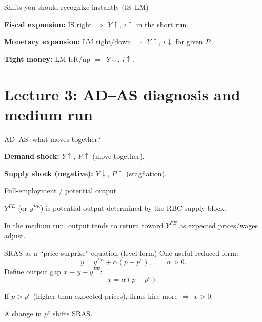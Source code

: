 \documentclass[aspectratio=169,xcolor=dvipsnames]{beamer}
\let\tempone\itemize
\let\temptwo\enditemize
\renewenvironment{itemize}{\tempone\addtolength{\itemsep}{\fill}}{\temptwo}
\begin{document}
\begin{frame}{Shifts you should recognize instantly (IS--LM)}
\begin{itemize}
\item \textbf{Fiscal expansion:} IS right $\Rightarrow$ $Y\uparrow$, $i\uparrow$ in the short run.
\item \textbf{Monetary expansion:} LM right/down $\Rightarrow$ $Y\uparrow$, $i\downarrow$ for given $P$.
\item \textbf{Tight money:} LM left/up $\Rightarrow$ $Y\downarrow$, $i\uparrow$.
\end{itemize}
\end{frame}

\section[Lecture 3]{Lecture 3: AD--AS diagnosis and medium run}

\begin{frame}{AD--AS: what moves together?}
\begin{itemize}
\item \textbf{Demand shock:} $Y\uparrow$, $P\uparrow$ (move together).
\item \textbf{Supply shock (negative):} $Y\downarrow$, $P\uparrow$ (stagflation).
\end{itemize}
\end{frame}

\begin{frame}{Full-employment / potential output}
\begin{itemize}
\item $Y^{FE}$ (or $y^{FE}$) is potential output determined by the RBC supply block.
\item In the medium run, output tends to return toward $Y^{FE}$ as expected prices/wages adjust.
\end{itemize}
\end{frame}

\begin{frame}{SRAS as a ``price surprise'' equation (level form)}
One useful reduced form:
\[
y=y^{FE}+\alpha(p-p^e),\qquad \alpha>0.
\]
Define output gap $x\equiv y-y^{FE}$:
\[
x=\alpha(p-p^e).
\]

\begin{itemize}
\item If $p>p^e$ (higher-than-expected prices), firms hire more $\Rightarrow$ $x>0$.
\item A change in $p^e$ shifts SRAS.
\end{itemize}
\end{frame}
\end{document}
